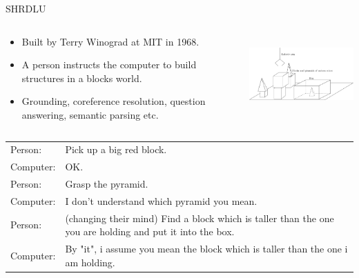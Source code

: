 \documentclass[usenames,dvipsnames,notes,11pt,aspectratio=169]{beamer}
\begin{document}
\begin{frame}
    {SHRDLU}
    \begin{columns}
        \begin{column}{0.6\textwidth}
    \begin{itemize}
        \item Built by Terry Winograd at MIT in 1968.
        \item A person instructs the computer to build structures in a blocks world.
        \item Grounding, coreference resolution, question answering, semantic parsing etc. 
    \end{itemize}
        \end{column}
        \begin{column}{0.4\textwidth}
    \begin{center}
    \includegraphics[height=3cm]{figures/shrdlu}
    \end{center}
        \end{column}
    \end{columns}
    \begin{table}
        \begin{tabular}{lp{12cm}}
            Person:& Pick up a big red block.\\
            Computer:& OK.\\
            Person:& Grasp the pyramid.\\
            Computer:& I don't understand which pyramid you mean.\\
            Person:& (changing their mind) Find a block which is taller than the one you are holding and put it into the box.\\
            Computer:& By "it", i assume you mean the block which is taller than the one i am holding.
    \end{tabular}
    \end{table}
\end{frame}
\end{document}
